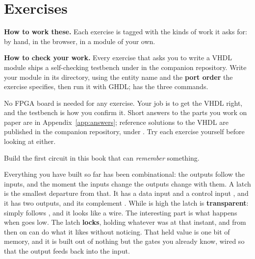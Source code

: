 
\section{Exercises}
\label{c3:sec:exercises}

\begin{aside}
\textbf{How to work these.} Each exercise is tagged with the kinds of work it asks for:
 by hand,  in the browser,  in a module of your own.

\textbf{How to check your work.} Every exercise that asks you to write a VHDL module ships a
self-checking testbench under  in the companion repository. Write your
module in its  directory, using the entity name and the \textbf{port order}
the exercise specifies, then run it with GHDL;  has the three commands.

No FPGA board is needed for any exercise. Your job is to get the VHDL right, and the testbench is
how you confirm it. Short answers to the parts you work on paper are in
Appendix~\ref{app:answers}; reference solutions to the VHDL are published in the companion
repository, under . Try each exercise yourself before looking at
either.
\end{aside}

\label{c3:set:1}

\label{c3:ex:1}
Build the first circuit in this book that can \emph{remember} something.

Everything you have built so far has been combinational: the outputs follow the inputs, and the
moment the inputs change the outputs change with them. A latch is the smallest departure from that.
It has a data input  and a control input , and it has two outputs,  and
its complement . While  is high the latch is \textbf{transparent}: 
simply follows , and it looks like a wire. The interesting part is what happens when
 goes low. The latch \textbf{locks}, holding whatever  was at that instant, and
from then on  can do what it likes without  noticing. That held value is one bit of
memory, and it is built out of nothing but the gates you already know, wired so that the output
feeds back into the input.

